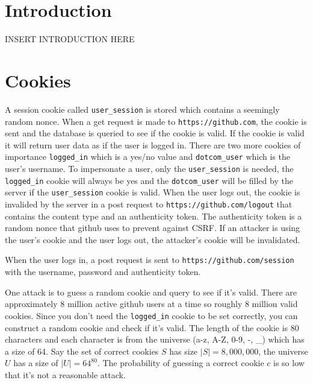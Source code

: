 \documentclass[12pt]{article}
\begin{document}
\maketitle

\section{Introduction}
INSERT INTRODUCTION HERE

\section{Cookies}\label{cookies}
	A session cookie called {\tt user\_session} is stored which contains a seemingly random nonce. When a get request is made to {\tt https://github.com}, the cookie is sent and the database is queried to see if the cookie is valid. If the cookie is valid it will return user data as if the user is logged in. There are two more cookies of importance {\tt logged\_in} which is a yes/no value and {\tt dotcom\_user} which is the user's username. To impersonate a user, only the {\tt user\_session} is needed, the {\tt logged\_in} cookie will always be yes and the {\tt dotcom\_user} will be filled by the server if the {\tt user\_session} cookie is valid. When the user logs out, the cookie is invalided by the server in a post request to {\tt https://github.com/logout} that contains the content type and an authenticity token. The authenticity token is a random nonce that github uses to prevent against CSRF. If an attacker is using the user's cookie and the user logs out, the attacker's cookie will be invalidated.


When the user logs in, a post request is sent to {\tt https://github.com/session} with the username, password and authenticity token.

One attack is to guess a random cookie and query to see if it's valid. There are approximately 8 million active github users at a time so roughly 8 million valid cookies. Since you don't need the {\tt logged\_in} cookie to be set correctly, you can construct a random cookie and check if it's valid. The length of the cookie is 80 characters and each character is from the universe (a-z, A-Z, 0-9, -, \_) which has a size of 64. Say the set of correct cookies $S$  has size $|S| = 8,000,000$, the universe $U$ has a size of $|U| = 64^{80}$. The probability of guessing a correct cookie $c$ is so low that it's not a reasonable attack.
\end{document}

